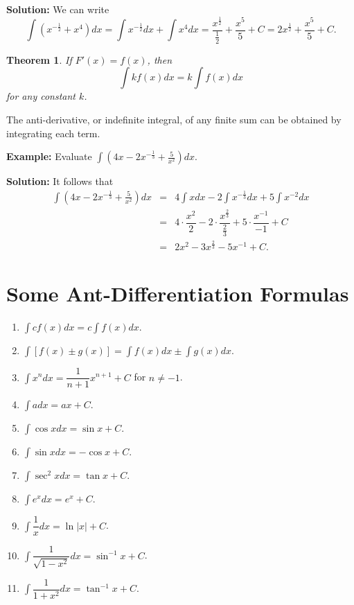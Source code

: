 \documentclass[titlepage,a4paper,12pt]{report}
\newtheorem{theorem}{Theorem}[section]
\begin{document}
\noindent \textbf{Solution:} We can write 
\begin{equation*}
\int (x^{-\frac{1}{2}}+x^4)dx =\int x^{-\frac{1}{2}}dx +\int x^4 dx =\frac{x^{\frac{1}{2}}}{\frac{1}{2}}+\frac{x^5}{5}+C=2x^{\frac{1}{2}}+\frac{x^5}{5}+C.
\end{equation*} 
\begin{theorem}
If $F'(x)=f(x)$, then 
\begin{equation*}
\int kf(x)dx=k\int f(x)dx
\end{equation*}
for any constant $k$.
\end{theorem}

\noindent The anti-derivative, or indefinite integral, of any finite sum can be obtained by integrating each term.

\noindent \textbf{Example:} Evaluate $\displaystyle \int \left(4x-2x^{-\frac{1}{3}}+\frac{5}{x^2} \right)dx$.

\noindent \textbf{Solution:} It follows that 
\begin{eqnarray*}
\int \left(4x-2x^{-\frac{1}{3}}+\frac{5}{x^2} \right)dx &=& 4\int x dx-2\int x^{-\frac{1}{3}}dx +5\int x^{-2}dx\\
&=& 4\cdot \dfrac{x^2}{2}-2\cdot \dfrac{x^{\frac{2}{3}}}{\frac{2}{3}}+5\cdot \dfrac{x^{-1}}{-1}+C\\
&=&2x^2 -3x^{\frac{2}{3}}-5x^{-1} +C.
\end{eqnarray*}
\section{Some Ant-Differentiation Formulas}
\begin{enumerate}
\item $\displaystyle \int cf(x)dx=c\int f(x)dx $.
\item $\displaystyle \int [f(x)\pm g(x)]=\displaystyle \int f(x)dx \pm \displaystyle \int g(x)dx$.
\item $\displaystyle \int x^n dx =\dfrac{1}{n+1} x^{n+1} + C$ for $n\neq -1$.
\item $\displaystyle \int adx =ax +C $.
\item $\displaystyle \int \cos x dx =\sin x +C$.
\item $\displaystyle \int \sin x dx =-\cos x +C$.
\item $\displaystyle \int\sec ^2 x dx =\tan x +C$.
\item $\displaystyle \int e^x dx =e^x +C$.
\item $\displaystyle \int \dfrac{1}{x} dx =\ln |x| +C$.
\item $\displaystyle \int \dfrac{1}{\sqrt{1-x^2}}dx =\sin ^{-1} x +C$.
\item $\displaystyle \int \dfrac{1}{1+x^2}dx= \tan ^{-1} x +C$.
\end{enumerate}
\end{document}
